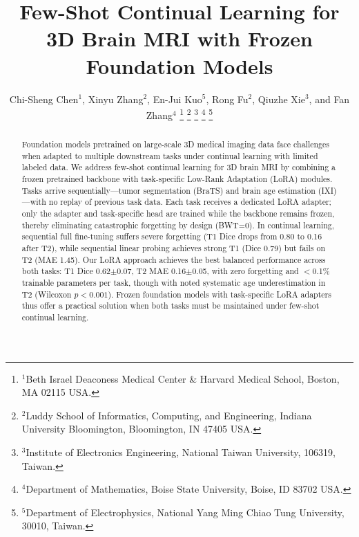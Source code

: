 \documentclass[journal,twoside,web]{ieeecolor}
\begin{document}
\title{Few-Shot Continual Learning for 3D Brain MRI with Frozen Foundation Models}

\author{Chi-Sheng Chen$^{1}$,
Xinyu Zhang$^{2}$,
En-Jui Kuo$^{5}$,
Rong Fu$^{2}$,
Qiuzhe Xie$^{3}$,
and Fan Zhang$^{4}$
\thanks{$^{1}$Beth Israel Deaconess Medical Center \& Harvard Medical School, Boston, MA 02115 USA.}
\thanks{$^{2}$Luddy School of Informatics, Computing, and Engineering, Indiana University Bloomington, Bloomington, IN 47405 USA.}
\thanks{$^{3}$Institute of Electronics Engineering, National Taiwan University, 106319, Taiwan.}
\thanks{$^{4}$Department of Mathematics, Boise State University, Boise, ID 83702 USA.}
\thanks{$^{5}$Department of Electrophysics, National Yang Ming Chiao Tung University, 30010, Taiwan.}}

\maketitle

\begin{abstract}
Foundation models pretrained on large-scale 3D medical imaging data face challenges when adapted to multiple downstream tasks under continual learning with limited labeled data. We address few-shot continual learning for 3D brain MRI by combining a frozen pretrained backbone with task-specific Low-Rank Adaptation (LoRA) modules. Tasks arrive sequentially---tumor segmentation (BraTS) and brain age estimation (IXI)---with no replay of previous task data. Each task receives a dedicated LoRA adapter; only the adapter and task-specific head are trained while the backbone remains frozen, thereby eliminating catastrophic forgetting by design (BWT=0). In continual learning, sequential full fine-tuning suffers severe forgetting (T1 Dice drops from 0.80 to 0.16 after T2), while sequential linear probing achieves strong T1 (Dice 0.79) but fails on T2 (MAE 1.45). Our LoRA approach achieves the best balanced performance across both tasks: T1 Dice 0.62$\pm$0.07, T2 MAE 0.16$\pm$0.05, with zero forgetting and $<$0.1\% trainable parameters per task, though with noted systematic age underestimation in T2 (Wilcoxon $p<0.001$). Frozen foundation models with task-specific LoRA adapters thus offer a practical solution when both tasks must be maintained under few-shot continual learning.
\end{abstract}

\end{document}
